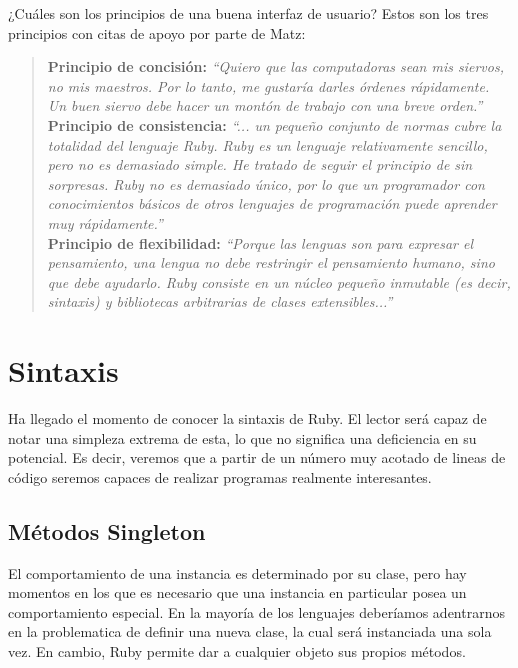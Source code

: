 \documentclass{article}
\begin{document}
\bigskip
¿Cuáles son los principios de una buena interfaz de usuario? Estos son los tres principios con citas de apoyo por parte de Matz:\\

\begin{quotation}
\noindent \textbf{Principio de concisión:} \textit{``Quiero que las computadoras sean mis siervos, no mis maestros. Por lo tanto, me gustaría darles órdenes rápidamente. Un buen siervo debe hacer un montón de trabajo con una breve orden.''}\\

\noindent \textbf{Principio de consistencia:} \textit{``... un pequeño conjunto de normas cubre la totalidad del lenguaje Ruby. Ruby es un lenguaje relativamente sencillo, pero no es demasiado simple. He tratado de seguir el principio de \textit{sin sorpresas}. Ruby no es demasiado único, por lo que un programador con conocimientos básicos de otros lenguajes de programación puede aprender muy rápidamente.''}\\

\noindent \textbf{Principio de flexibilidad:} \textit{``Porque las lenguas son para expresar el pensamiento, una lengua no debe restringir el pensamiento humano, sino que debe ayudarlo. Ruby consiste en un núcleo pequeño inmutable (es decir, sintaxis) y bibliotecas arbitrarias de clases extensibles...''}
\end{quotation}




\section{Sintaxis}

	Ha llegado el momento de conocer la sintaxis de Ruby. El lector será capaz de notar una simpleza extrema de esta, lo que no significa una deficiencia en su potencial. Es decir, veremos que a partir de un número muy acotado de lineas de código seremos capaces de realizar programas realmente interesantes.


\subsection{Métodos Singleton}

	El comportamiento de una instancia es determinado por su clase, pero hay momentos en los que es necesario que una instancia en particular posea un comportamiento especial. En la mayoría de los lenguajes deberíamos adentrarnos en la problematica de definir una nueva clase, la cual será instanciada una sola vez. En cambio, Ruby permite dar a cualquier objeto sus propios métodos.
\end{document}
